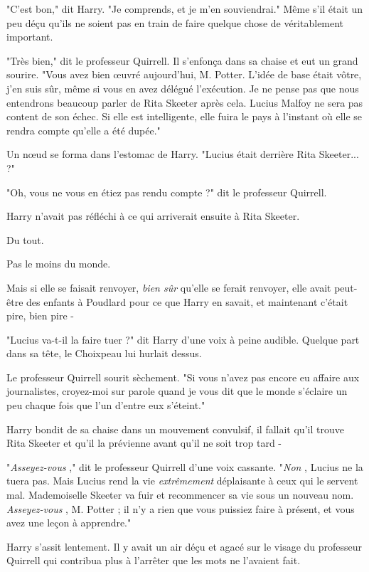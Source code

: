 "C'est bon," dit Harry. "Je comprends, et je m'en souviendrai." Même s'il était un peu déçu qu'ils ne soient pas en train de faire quelque chose de véritablement important.

"Très bien," dit le professeur Quirrell. Il s'enfonça dans sa chaise et eut un grand sourire. "Vous avez bien œuvré aujourd'hui, M. Potter. L'idée de base était vôtre, j'en suis sûr, même si vous en avez délégué l'exécution. Je ne pense pas que nous entendrons beaucoup parler de Rita Skeeter après cela. Lucius Malfoy ne sera pas content de son échec. Si elle est intelligente, elle fuira le pays à l'instant où elle se rendra compte qu'elle a été dupée."

Un nœud se forma dans l'estomac de Harry. "Lucius était derrière Rita Skeeter... ?"

"Oh, vous ne vous en étiez pas rendu compte ?" dit le professeur Quirrell.

Harry n'avait pas réfléchi à ce qui arriverait ensuite à Rita Skeeter.

Du tout.

Pas le moins du monde.

Mais si elle se faisait renvoyer, \emph{bien sûr}  qu'elle se ferait renvoyer, elle avait peut-être des enfants à Poudlard pour ce que Harry en savait, et maintenant c'était pire, bien pire -

"Lucius va-t-il la faire tuer ?" dit Harry d'une voix à peine audible. Quelque part dans sa tête, le Choixpeau lui hurlait dessus.

Le professeur Quirrell sourit sèchement. "Si vous n'avez pas encore eu affaire aux journalistes, croyez-moi sur parole quand je vous dit que le monde s'éclaire un peu chaque fois que l'un d'entre eux s'éteint."

Harry bondit de sa chaise dans un mouvement convulsif, il fallait qu'il trouve Rita Skeeter et qu'il la prévienne avant qu'il ne soit trop tard -

"\emph{Asseyez-vous} ," dit le professeur Quirrell d'une voix cassante. "\emph{Non} , Lucius ne la tuera pas. Mais Lucius rend la vie \emph{extrêmement}  déplaisante à ceux qui le servent mal. Mademoiselle Skeeter va fuir et recommencer sa vie sous un nouveau nom. \emph{Asseyez-vous} , M. Potter ; il n'y a rien que vous puissiez faire à présent, et vous avez une leçon à apprendre."

Harry s'assit lentement. Il y avait un air déçu et agacé sur le visage du professeur Quirrell qui contribua plus à l'arrêter que les mots ne l'avaient fait.


